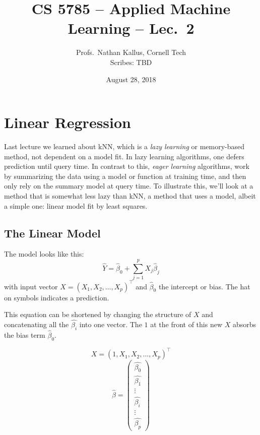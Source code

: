 \documentclass[a4paper]{article}
\title{CS 5785 -- Applied Machine Learning -- Lec.\ 2}
\author{Profs.\ Nathan Kallus, Cornell Tech\\Scribes: TBD}
\date{August 28, 2018}
\begin{document}
\maketitle

\section{Linear Regression}
Last lecture we learned about kNN, which is a \emph{lazy learning} or memory-based method, not dependent on a model fit. In lazy learning algorithms, one defers prediction until query time.  In contrast to this, \emph{eager learning} algorithms, work by summarizing the data using a model or function at training time, and then only rely on the summary model at query time.  To illustrate this, we'll look at a method that is somewhat less lazy than kNN, a method that uses a model, albeit a simple one: linear model fit by least squares.

\subsection{The Linear Model}

The model looks like this:
$${\hat Y} = {\hat \beta}_0+\sum_{j=1}^p X_j{\hat \beta}_j$$
with input vector $X=(X_1,X_2,\ldots,X_p)^\top$ and ${\hat \beta}_0$ the intercept or bias.  The hat on symbols indicates a prediction. \\

This equation can be shortened by changing the structure of $X$ and concatenating all the $\hat{\beta_i}$ into one vector. The $1$ at the front of this new $X$ absorbs the bias term ${\hat \beta}_0$.

$$ X=(1,X_1,X_2,\ldots,X_p)^\top $$
$$ \hat{\beta} = \begin{pmatrix} \hat{\beta_0} \\ \hat{\beta_1} \\ \vdots \\ \hat{\beta_i} \\ \vdots \\ \hat{\beta_p} \end{pmatrix} $$
\end{document}
